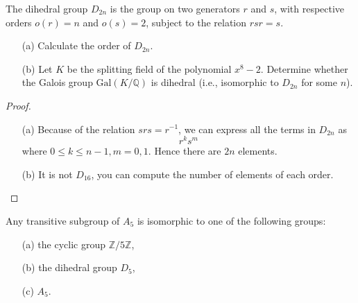 \begin{prob}[F2015-Q2]
    The dihedral group \(D_{2n}\) is the group on two generators \(r\) and \(s\), with respective orders \(o(r)=n\) and \(o(s)=2\), subject to the relation \(rsr=s\).
    \begin{itemize}
        \item[(a)] Calculate the order of \(D_{2n}\).
        \item[(b)] Let \(K\) be the splitting field of the polynomial \(x^8 - 2\). Determine whether the Galois group \(\text{Gal}(K/\mathbb{Q})\) is dihedral (i.e., isomorphic to \(D_{2n}\) for some \(n\)).
    \end{itemize}
\end{prob}
\begin{proof}
    \begin{itemize}
        \item[(a)] Because of the relation $srs=r^{-1}$, we can express all the terms in $D_{2n}$ as 
        \begin{equation*}
            r^ks^m
        \end{equation*}
        where $0\leq k\leq n-1, m=0,1$. Hence there are $2n$ elements.
        \item[(b)] It is not $D_{16}$, you can compute the number of elements of each order.
    \end{itemize}
\end{proof}


\begin{prop}[S2019-Q1]
    Any transitive subgroup of \(A_{5}\) is isomorphic to one of the following groups:
    \begin{itemize}
        \item[(a)] the cyclic group \(\mathbb{Z}/5\mathbb{Z}\),
        \item[(b)] the dihedral group \(D_{5}\),
        \item[(c)] \(A_{5}\).
    \end{itemize}
\end{prop}





